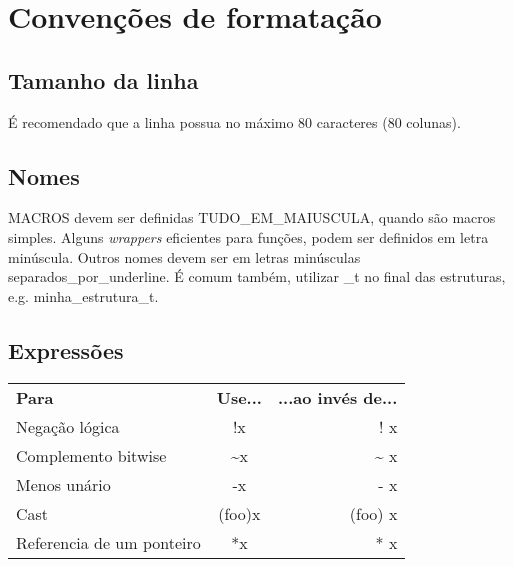 \documentclass{article}
\begin{document}
\section{Convenções de formatação}
\subsection{Tamanho da linha}
É recomendado que a linha possua no máximo 80 caracteres (80 colunas).

\subsection{Nomes}
MACROS devem ser definidas TUDO\_EM\_MAIUSCULA, quando são macros simples. Alguns \emph{wrappers} eficientes para funções, podem ser definidos em letra minúscula. Outros nomes devem ser em letras minúsculas separados\_por\_underline. É comum também, utilizar \_t no final das estruturas, e.g. minha\_estrutura\_t.

\subsection{Expressões}
\begin{tabular}{ l c r }
	{\bf Para} 			& {\bf Use...} 		& {\bf ...ao invés de...} \\
	Negação lógica 			& !x 			& ! x \\
	Complemento bitwise 		& \textasciitilde x 	& \textasciitilde{}  x \\
	Menos unário			& -x			& - x \\
	Cast				& (foo)x		& (foo) x \\
	Referencia de um ponteiro	& *x			& * x \\
\end{tabular}
\end{document}
